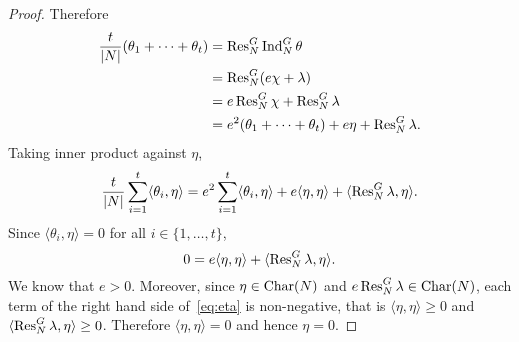 \begin{proof}
    \bigskip 
    Therefore 
    \begin{align*}
        \frac{t}{|N|}(\theta_1+\cdots+\theta_t)
        &=\operatorname{Res}_N^G\operatorname{Ind}_N^G\theta\\
        &=\operatorname{Res}_N^G(e\chi+\lambda)\\
        &=e\operatorname{Res}_N^G\chi+\operatorname{Res}_N^G\lambda\\
        &=e^2(\theta_1+\cdots+\theta_t)+e\eta+\operatorname{Res}_N^G\lambda.
    \end{align*}
    Taking inner product against $\eta$,  
    \[
    \frac{t}{|N|}\sum_{i=1}^t\langle\theta_i,\eta\rangle 
    =e^2\sum_{i=1}^t\langle\theta_i,\eta\rangle+e\langle\eta,\eta\rangle+\langle\operatorname{Res}_N^G\lambda,\eta\rangle. 
    \]
    Since $\langle\theta_i,\eta\rangle=0$ for all $i\in\{1,\dots,t\}$, 
    \begin{equation}
    \label{eq:eta}
    0=e\langle\eta,\eta\rangle+\langle\operatorname{Res}_N^G\lambda,\eta\rangle.
    \end{equation}
    We know that $e>0$. Moreover, since $\eta\in\operatorname{Char}(N)$ and 
    $e\operatorname{Res}_N^G\lambda\in\operatorname{Char}(N)$, each term of the right hand side of~\eqref{eq:eta} is non-negative, that is 
    $\langle\eta,\eta\rangle\geq0$ and 
    $\langle\operatorname{Res}_N^G\lambda,\eta\rangle\geq0$. Therefore 
    $\langle\eta,\eta\rangle=0$ and hence $\eta=0$. 
\end{proof}

    

